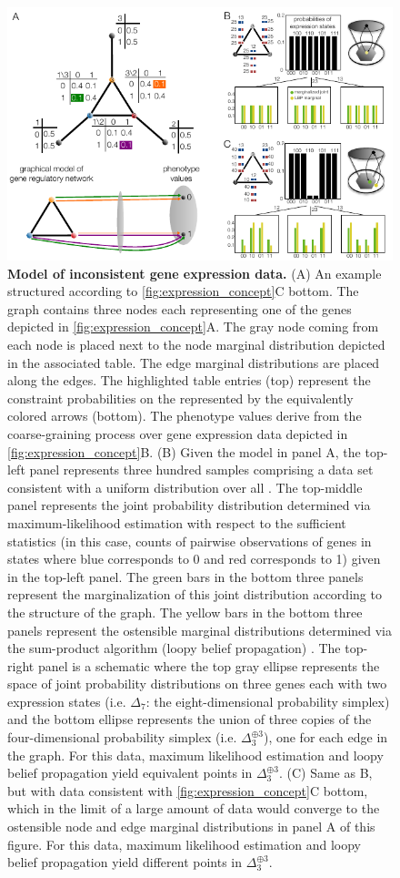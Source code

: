 \begin{figure}[!ht]
\centering
\noindent\includegraphics[width=0.9\columnwidth]{fig/inconsistentthreecycle.pdf}
\caption{{\bf Model of inconsistent gene expression data.} (A) An example structured according to \ref{fig:expression_concept}C bottom. The graph contains three nodes each representing one of the genes depicted in \ref{fig:expression_concept}A. The gray node coming from each node is placed next to the node marginal distribution depicted in the associated table. The edge marginal distributions are placed along the edges. The highlighted table entries (top) represent the constraint probabilities on the \gnpm{} represented by the equivalently colored arrows (bottom). The phenotype values derive from the coarse-graining process over gene expression data depicted in \ref{fig:expression_concept}B. (B) Given the model in panel A, the top-left panel represents three hundred samples comprising a data set consistent with a uniform distribution over all \gnpm{}. The top-middle panel represents the joint probability distribution determined via maximum-likelihood estimation with respect to the sufficient statistics (in this case, counts of pairwise observations of genes in states where blue corresponds to 0 and red corresponds to 1) given in the top-left panel. The green bars in the bottom three panels represent the marginalization of this joint distribution according to the structure of the graph. The yellow bars in the bottom three panels represent the ostensible marginal distributions determined via the sum-product algorithm (loopy belief propagation) \cite{Barber2012}. The top-right panel is a schematic where the top gray ellipse represents the space of joint probability distributions on three genes each with two expression states (i.e. $\Delta_7$: the eight-dimensional probability simplex) and the bottom ellipse represents the union of three copies of the four-dimensional probability simplex (i.e. $\Delta_3^{\oplus 3}$), one for each edge in the graph.  For this data, maximum likelihood estimation and loopy belief propagation yield equivalent points in $\Delta_3^{\oplus 3}$. (C) Same as B, but with data consistent with \ref{fig:expression_concept}C bottom, which in the limit of a large amount of data would converge to the ostensible node and edge marginal distributions in panel A of this figure. For this data, maximum likelihood estimation and loopy belief propagation yield different points in $\Delta_3^{\oplus 3}$.}
\label{fig:inconsistentthreecycle}
\end{figure}

